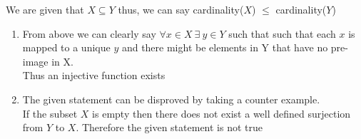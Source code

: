 \documentclass[12pt]{article}
\newenvironment{solution}[2][Solution]{ \begin{trivlist}
\item[\hskip \labelsep {\bfseries #1}]}{\end{trivlist}}
\begin{document}
\begin{solution}{4}
\item[]
We are given that $X \subseteq Y$ thus, we can say cardinality($X$) $\leq$ cardinality($Y$)
\begin{enumerate}[label=\alph*)]
    \item From above we can clearly say $\forall x \in X\ \exists\ y \in Y$ such that such that each $x$ is mapped to a unique $y$ and there might be elements in Y that have no pre-image in X.\\
    Thus an injective function exists
    \item The given statement can be disproved by taking a counter example. \\ If the subset $X$ is empty then there does not exist a well defined surjection from $Y$ to $X$.
    Therefore the given statement is not true
\end{enumerate}
\end{solution}

\vskip 0.5in
\end{document}
